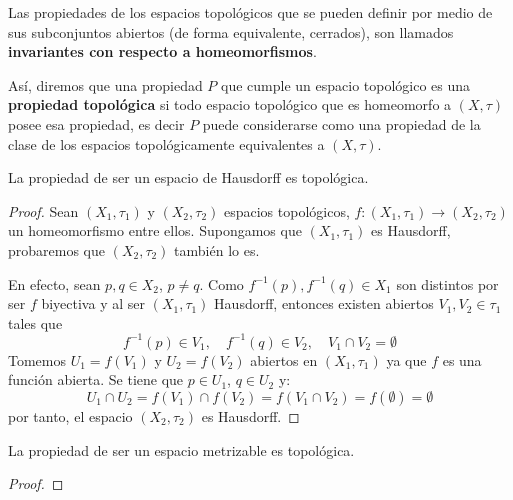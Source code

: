 \documentclass[12pt]{report}
\theoremstyle{largebreak}
\newcommand\cf[3]{\ensuremath{#1:#2\rightarrow#3}}
\begin{document}
    \begin{mydef}
        Las propiedades de los espacios topológicos que se pueden definir por medio de sus subconjuntos abiertos (de forma equivalente, cerrados), son llamados \textbf{invariantes con respecto a homeomorfismos}.

        Así, diremos que una propiedad $P$ que cumple un espacio topológico es una \textbf{propiedad topológica} si todo espacio topológico que es homeomorfo a $(X,\tau)$ posee esa propiedad, es decir $P$ puede considerarse como una propiedad de la clase de los espacios topológicamente equivalentes a $(X,\tau)$.
    \end{mydef}

    \begin{propo}
        La propiedad de ser un espacio de Hausdorff es topológica.
    \end{propo}

    \begin{proof}
        Sean $(X_1,\tau_1)$ y $(X_2,\tau_2)$ espacios topológicos, $\cf{f}{(X_1,\tau_1)}{(X_2,\tau_2)}$ un homeomorfismo entre ellos. Supongamos que $(X_1,\tau_1)$ es Hausdorff, probaremos que $(X_2,\tau_2)$ también lo es.

        En efecto, sean $p,q\in X_2$, $p\neq q$. Como $f^{-1}(p),f^{-1}(q)\in X_1$ son distintos por ser $f$ biyectiva y al ser $(X_1,\tau_1)$ Hausdorff, entonces existen abiertos $V_1,V_2\in\tau_1$ tales que
        \begin{equation*}
            f^{-1}(p)\in V_1,\quad f^{-1}(q)\in V_2,\quad V_1\cap V_2=\emptyset
        \end{equation*}
        Tomemos $U_1=f(V_1)$ y $U_2=f(V_2)$ abiertos en $(X_1,\tau_1)$ ya que $f$ es una función abierta. Se tiene que $p\in U_1$, $q\in U_2$ y:
        \begin{equation*}
            U_1\cap U_2=f(V_1)\cap f(V_2)=f(V_1\cap V_2)=f(\emptyset)=\emptyset
        \end{equation*}
        por tanto, el espacio $(X_2,\tau_2)$ es Hausdorff.
    \end{proof}

    \begin{excer}
        La propiedad de ser un espacio metrizable es topológica.
    \end{excer}

    \begin{proof}
        
    \end{proof}
\end{document}
